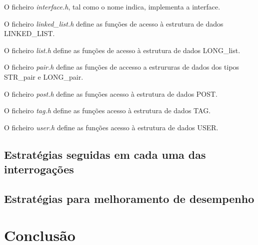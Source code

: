 \documentclass[10pt]{report}
\begin{document}
O ficheiro \textit{interface.h}, tal como o nome indica, implementa a interface.

O ficheiro \textit{linked\_list.h} define as funções de acesso à estrutura de dados LINKED\_LIST.

O ficheiro \textit{list.h} define as funções de acesso à estrutura de dados LONG\_list.

O ficheiro \textit{pair.h} define as funções de accesso a estrururas de dados dos tipos STR\_pair e LONG\_pair.

O ficheiro \textit{post.h} define as funções acesso à estrutura de dados POST.

O ficheiro \textit{tag.h} define as funções acesso à estrutura de dados TAG.

O ficheiro \textit{user.h} define as funções acesso à estrutura de dados USER.
\section{Estratégias seguidas em cada uma das interrogações}

\section{Estratégias para melhoramento de desempenho}

\chapter{Conclusão}
\label{sec:conclusao}
\end{document}
